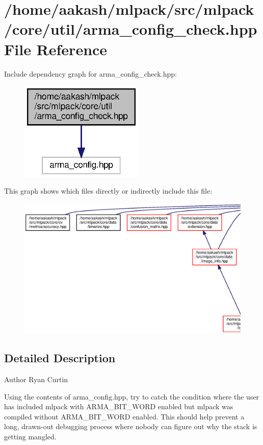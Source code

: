 \section{/home/aakash/mlpack/src/mlpack/core/util/arma\+\_\+config\+\_\+check.hpp File Reference}
\label{arma__config__check_8hpp}
Include dependency graph for arma\+\_\+config\+\_\+check.\+hpp\+:
\nopagebreak
\begin{figure}[H]
\begin{center}
\leavevmode
\includegraphics[width=167pt]{arma__config__check_8hpp__incl}
\end{center}
\end{figure}
This graph shows which files directly or indirectly include this file\+:
\nopagebreak
\begin{figure}[H]
\begin{center}
\leavevmode
\includegraphics[width=350pt]{arma__config__check_8hpp__dep__incl}
\end{center}
\end{figure}


\subsection{Detailed Description}
\begin{DoxyAuthor}{Author}
Ryan Curtin
\end{DoxyAuthor}
Using the contents of arma\+\_\+config.\+hpp, try to catch the condition where the user has included mlpack with A\+R\+M\+A\+\_\+B\+I\+T\+\_\+\+W\+O\+RD enabled but mlpack was compiled without A\+R\+M\+A\+\_\+B\+I\+T\+\_\+\+W\+O\+RD enabled. This should help prevent a long, drawn-\/out debugging process where nobody can figure out why the stack is getting mangled.

